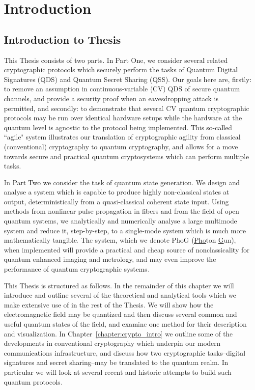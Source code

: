\chapter{Introduction}


\section{Introduction to Thesis}

This Thesis consists of two parts. In Part One, we consider several related cryptographic protocols which securely perform the tasks of Quantum Digital Signatures (QDS) and Quantum Secret Sharing (QSS). Our goals here are, firstly: to remove an assumption in continuous-variable (CV) QDS of secure quantum channels, and provide a security proof when an eavesdropping attack is permitted, and secondly: to demonstrate that several CV quantum cryptographic protocols may be run over identical hardware setups while the hardware at the quantum level is agnostic to the protocol being implemented. This so-called ``agile" system illustrates our translation of cryptographic agility from classical (conventional) cryptography to quantum cryptography, and allows for a move towards secure and practical quantum cryptosystems which can perform multiple tasks.

In Part Two we consider the task of quantum state generation. We design and analyse a system which is capable to produce highly non-classical states at output, deterministically from a quasi-classical coherent state input. Using methods from nonlinear pulse propagation in fibers and from the field of open quantum systems, we analytically and numerically analyse a large multimode system and reduce it, step-by-step, to a single-mode system which is much more mathematically tangible. The system, which we denote PhoG (\underline{Pho}ton \underline{G}un), when implemented will provide a practical and cheap source of nonclassicality for quantum enhanced imaging and metrology, and may even improve the performance of quantum cryptographic systems.

This Thesis is structured as follows. In the remainder of this chapter we will introduce and outline several of the theoretical and analytical tools which we make extensive use of in the rest of the Thesis. We will show how the electromagnetic field may be quantized and then discuss several common and useful quantum states of the field, and examine one method for their description and visualization. In Chapter~\ref{chapter:crypto_intro} we outline some of the developments in conventional cryptography which underpin our modern communications infrastructure, and discuss how two cryptographic tasks--digital signatures and secret sharing--may be translated to the quantum realm. In particular we will look at several recent and historic attempts to build such quantum protocols.

